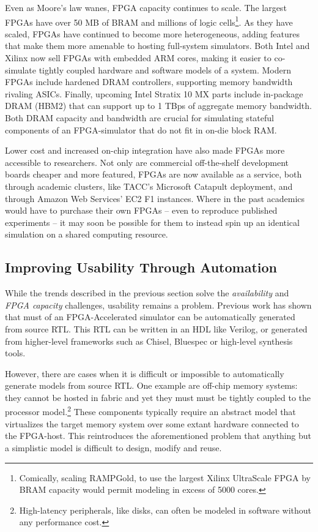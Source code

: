 Even as Moore's law wanes, FPGA capacity continues to scale. The largest FPGAs
have over 50 MB of BRAM and millions of logic cells\footnote{Comically, scaling
RAMPGold\cite{rampgold}, to use the largest Xilinx UltraScale
FPGA\cite{ultrascale} by BRAM capacity would permit modeling in excess of 5000
cores.}. As they have scaled, FPGAs have continued to become more
heterogeneous, adding features that make them more amenable to hosting
full-system simulators.  Both Intel and Xilinx now sell FPGAs with embedded ARM
cores, making it easier to co-simulate tightly coupled hardware and software
models of a system. Modern FPGAs include hardened DRAM controllers, supporting
memory bandwidth rivaling ASICs. Finally, upcoming Intel Stratix 10 MX parts
include in-package DRAM (HBM2) that can support up to 1 TBps of aggregate
memory bandwidth\cite{stratix10mx}. Both DRAM capacity and bandwidth are
crucial for simulating stateful components of an FPGA-simulator that do not fit
in on-die block RAM.

Lower cost and increased on-chip integration have also made FPGAs more
accessible to researchers.  Not only are commercial off-the-shelf development
boards cheaper and more featured, FPGAs are now available as a service, both
through academic clusters, like TACC's Microsoft
Catapult\cite{catapultannounce} deployment, and through Amazon Web Services'
EC2 F1 instances\cite{amazonf1}. Where in the past academics would have to
purchase their own FPGAs -- even to reproduce published experiments -- it may
soon be possible for them to instead spin up an identical simulation on a
shared computing resource.

\subsection{Improving Usability Through Automation}

While the trends described in the previous section solve the
\emph{availability} and \emph{FPGA capacity} challenges, usability remains a
problem. Previous work\cite{fabscalarfpga, strober} has shown that must of an
FPGA-Accelerated simulator can be automatically generated from source RTL. This
RTL can be written in an HDL like Verilog, or generated from higher-level
frameworks such as Chisel, Bluespec or high-level synthesis tools.

However, there are cases when it is difficult or impossible to automatically
generate models from source RTL. One example are off-chip memory systems: they
cannot be hosted in fabric and yet they must must be tightly coupled to the
processor model.\footnote{High-latency peripherals, like disks, can often be
modeled in software without any performance cost.\cite{disksim}} These
components typically require an abstract model that virtualizes the target
memory system over some extant hardware connected to the FPGA-host. This
reintroduces the aforementioned problem that anything but a simplistic model is
difficult to design, modify and reuse.

